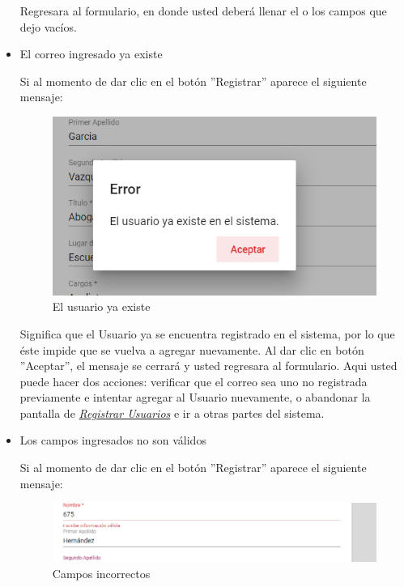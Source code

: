 \begin{itemize}
                         Regresara  al formulario, en donde usted deberá llenar el o los campos que dejo vacíos. 
                    
                    \item El correo ingresado ya existe
                
                        Si al momento de dar clic en el botón ''Registrar'' aparece el siguiente mensaje:
                        	
                         \begin{figure}[!hbtp]
                        	\centering
                        \includegraphics[width=0.4\linewidth]{images/SP5/MSG36}
                        	\caption{El usuario ya existe}
                        	\label{mensaje36}
                        
                        \end{figure}
                    
                        Significa que el Usuario ya se encuentra registrado en el sistema, por lo que éste impide que se vuelva a agregar nuevamente. Al dar clic en botón ''Aceptar'', el mensaje se cerrará y usted regresara al formulario. Aqui usted puede hacer dos acciones: verificar que el correo sea uno no registrada previamente e intentar agregar al Usuario nuevamente, o abandonar la pantalla de \hyperlink{registrarUs}{\textit{Registrar Usuarios}} e ir a otras partes del sistema.
                    
                    \item Los campos ingresados no son válidos
                
                        Si al momento de dar clic en el botón ''Registrar'' aparece el siguiente mensaje:
                         \begin{figure}[!hbtp]
                        	\centering
                        	\includegraphics[width=0.4\linewidth]{images/SP5/MSG35}
                        	\caption{Campos incorrectos}
                        	\label{mensaje35}
                        

\end{figure}
\end{itemize}
